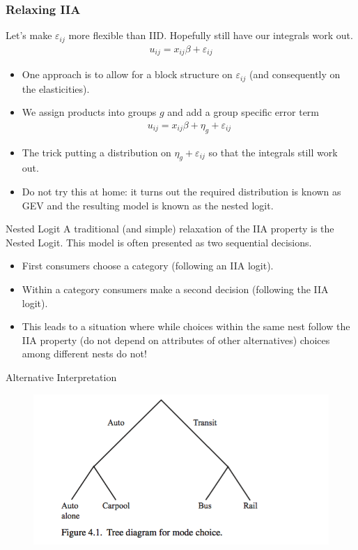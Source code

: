\documentclass[xcolor=pdftex,dvipsnames,table,mathserif,aspectratio=169]{beamer}
\begin{document}
\begin{frame}
\frametitle{Relaxing IIA}
Let's make $\varepsilon_{ij}$ more flexible than IID. Hopefully still have our integrals work out.
\begin{eqnarray*}
u_{ij} =   x_{ij} \beta  + \varepsilon_{ij}
\end{eqnarray*}
\begin{itemize}
\item One approach is to allow for a block structure on $\varepsilon_{ij}$ (and consequently on the elasticities).
\item We assign products into groups $g$ and add a group specific error term
\begin{eqnarray*}
u_{ij} =   x_{ij} \beta  + \eta_{g} + \varepsilon_{ij}
\end{eqnarray*}
\item The trick putting a distribution on $\eta_g + \varepsilon_{ij}$ so that the integrals still work out.
\item Do not try this at home: it turns out the required distribution is known as \alert{GEV} and the resulting model is known as the \alert{nested logit}.
\end{itemize}
\end{frame}

\begin{frame}{Nested Logit}
A traditional (and simple) relaxation of the IIA property is the Nested Logit. This model is often presented as two sequential decisions.
\begin{itemize}
\item First consumers choose a category (following an IIA logit).
\item Within a category consumers make a second decision (following the IIA logit).
\item This leads to a situation where while choices within the same nest follow the IIA property (do not depend on attributes of other alternatives) choices among different nests do not!
\end{itemize}
\end{frame}

\begin{frame}{Alternative Interpretation}
\begin{figure}[htbp]
\begin{center}
\includegraphics[width=5in]{resources/nesting.png}
\end{center}
\end{figure}
\end{frame}
\end{document}
